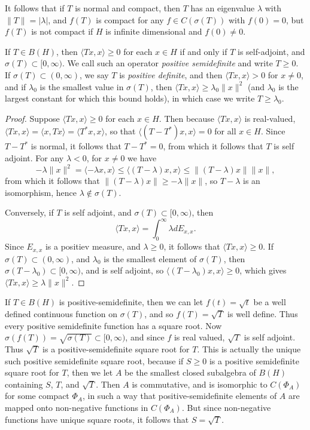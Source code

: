 It follows that if $T$ is normal and compact, then $T$ has an eigenvalue $\lambda$ with $\| T \| = |\lambda|$, and $f(T)$ is compact for any $f \in C(\sigma(T))$ with $f(0) = 0$, but $f(T)$ is not compact if $H$ is infinite dimensional and $f(0) \neq 0$.

\begin{theorem}
    If $T \in B(H)$, then $\langle Tx, x \rangle \geq 0$ for each $x \in H$ if and only if $T$ is self-adjoint, and $\sigma(T) \subset [0,\infty)$. We call such an operator \emph{positive semidefinite} and write $T \geq 0$. If $\sigma(T) \subset (0,\infty)$, we say $T$ is \emph{positive definite}, and then $\langle Tx, x \rangle > 0$ for $x \neq 0$, and if $\lambda_0$ is the smallest value in $\sigma(T)$, then $\langle Tx, x \rangle \geq \lambda_0 \| x \|^2$ (and $\lambda_0$ is the largest constant for which this bound holds), in which case we write $T \geq \lambda_0$.
\end{theorem}
\begin{proof}
    Suppose $\langle Tx,x \rangle \geq 0$ for each $x \in H$. Then because $\langle Tx, x \rangle$ is real-valued, $\langle Tx, x \rangle = \langle x, Tx \rangle = \langle T^* x, x \rangle$, so that $\langle (T - T^*) x, x \rangle = 0$ for all $x \in H$. Since $T - T^*$ is normal, it follows that $T - T^* = 0$, from which it follows that $T$ is self adjoint. For any $\lambda < 0$, for $x \neq 0$ we have
    \[ -\lambda \| x \|^2 = \langle -\lambda x, x \rangle \leq \langle (T-\lambda) x, x \rangle \leq \| (T - \lambda) x \| \| x \|, \]
    from which it follows that $\| (T - \lambda) x \| \geq - \lambda \| x \|$, so $T - \lambda$ is an isomorphism, hence $\lambda \not \in \sigma(T)$.

    Conversely, if $T$ is self adjoint, and $\sigma(T) \subset [0,\infty)$, then
    \[ \langle Tx, x \rangle = \int_0^\infty \lambda dE_{x,x}. \]
    Since $E_{x,x}$ is a positiev measure, and $\lambda \geq 0$, it follows that $\langle Tx,x\rangle \geq 0$. If $\sigma(T) \subset (0,\infty)$, and $\lambda_0$ is the smallest element of $\sigma(T)$, then $\sigma(T - \lambda_0) \subset [0,\infty)$, and is self adjoint, so $\langle (T - \lambda_0) x, x \rangle \geq 0$, which gives $\langle Tx, x \rangle \geq \lambda \| x \|^2$.
\end{proof}

If $T \in B(H)$ is positive-semidefinite, then we can let $f(t) = \sqrt{t}$ be a well defined continuous function on $\sigma(T)$, and so $f(T) = \sqrt{T}$ is well define. Thus every positive semidefinite function has a square root. Now $\sigma(f(T)) = \sqrt{\sigma(T)} \subset [0,\infty)$, and since $f$ is real valued, $\sqrt{T}$ is self adjoint. Thus $\sqrt{T}$ is a positive-semidefinite square root for $T$. This is actually the unique such positive semidefinite square root, because if $S \geq 0$ is a positive semidefinite square root for $T$, then we let $A$ be the smallest closed subalgebra of $B(H)$ containing $S$, $T$, and $\sqrt{T}$. Then $A$ is commutative, and is isomorphic to $C(\Phi_A)$ for some compact $\Phi_A$, in such a way that positive-semidefinite elements of $A$ are mapped onto non-negative functions in $C(\Phi_A)$. But since non-negative functions have unique square roots, it follows that $S = \sqrt{T}$.

